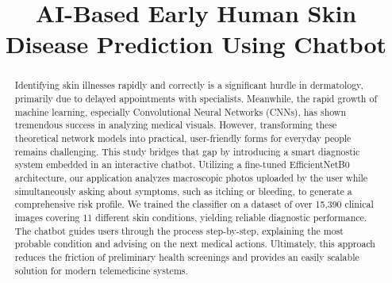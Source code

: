 \documentclass[conference]{IEEEtran}
\begin{document}
\title{AI-Based Early Human Skin Disease Prediction Using Chatbot}

\author{
\and
{}
\and
{}
}

\maketitle

\begin{abstract}
Identifying skin illnesses rapidly and correctly is a significant hurdle in dermatology, primarily due to delayed appointments with specialists. Meanwhile, the rapid growth of machine learning, especially Convolutional Neural Networks (CNNs), has shown tremendous success in analyzing medical visuals. However, transforming these theoretical network models into practical, user-friendly forms for everyday people remains challenging. This study bridges that gap by introducing a smart diagnostic system embedded in an interactive chatbot. Utilizing a fine-tuned EfficientNetB0 architecture, our application analyzes macroscopic photos uploaded by the user while simultaneously asking about symptoms, such as itching or bleeding, to generate a comprehensive risk profile. We trained the classifier on a dataset of over 15,390 clinical images covering 11 different skin conditions, yielding reliable diagnostic performance. The chatbot guides users through the process step-by-step, explaining the most probable condition and advising on the next medical actions. Ultimately, this approach reduces the friction of preliminary health screenings and provides an easily scalable solution for modern telemedicine systems.
\end{abstract}
\end{document}
